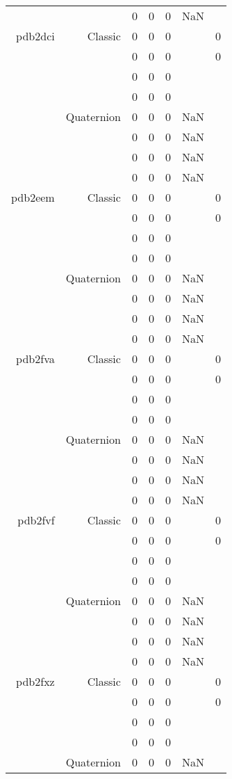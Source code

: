\begin{xltabular}{\textwidth}{r|rcccSc}
& & 0 & 0 & 0 & NaN & \\ \addlinespace
pdb2dci & Classic & 0 & 0 & 0 & & 0 \\
& & 0 & 0 & 0 & & 0 \\
& & 0 & 0 & 0 & & \\
& & 0 & 0 & 0 & & \\
& Quaternion & 0 & 0 & 0 & NaN & \\
& & 0 & 0 & 0 & NaN & \\
& & 0 & 0 & 0 & NaN & \\
& & 0 & 0 & 0 & NaN & \\ \addlinespace
pdb2eem & Classic & 0 & 0 & 0 & & 0 \\
& & 0 & 0 & 0 & & 0 \\
& & 0 & 0 & 0 & & \\
& & 0 & 0 & 0 & & \\
& Quaternion & 0 & 0 & 0 & NaN & \\
& & 0 & 0 & 0 & NaN & \\
& & 0 & 0 & 0 & NaN & \\
& & 0 & 0 & 0 & NaN & \\ \addlinespace
pdb2fva & Classic & 0 & 0 & 0 & & 0 \\
& & 0 & 0 & 0 & & 0 \\
& & 0 & 0 & 0 & & \\
& & 0 & 0 & 0 & & \\
& Quaternion & 0 & 0 & 0 & NaN & \\
& & 0 & 0 & 0 & NaN & \\
& & 0 & 0 & 0 & NaN & \\
& & 0 & 0 & 0 & NaN & \\ \addlinespace
pdb2fvf & Classic & 0 & 0 & 0 & & 0 \\
& & 0 & 0 & 0 & & 0 \\
& & 0 & 0 & 0 & & \\
& & 0 & 0 & 0 & & \\
& Quaternion & 0 & 0 & 0 & NaN & \\
& & 0 & 0 & 0 & NaN & \\
& & 0 & 0 & 0 & NaN & \\
& & 0 & 0 & 0 & NaN & \\ \addlinespace
pdb2fxz & Classic & 0 & 0 & 0 & & 0 \\
& & 0 & 0 & 0 & & 0 \\
& & 0 & 0 & 0 & & \\
& & 0 & 0 & 0 & & \\
& Quaternion & 0 & 0 & 0 & NaN & \\

\end{xltabular}
